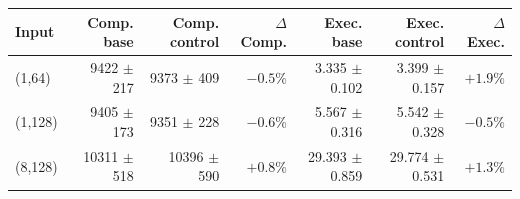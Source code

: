 \begin{tabular}{lrrrrrr}
\toprule
\textbf{Input} & \textbf{Comp. base} & \textbf{Comp. control} & \(\Delta\)\textbf{ Comp.} & \textbf{Exec. base} & \textbf{Exec. control} & \(\Delta\)\textbf{ Exec.} \\
\midrule
(1,64) & 9422 $\pm$ 217 & 9373 $\pm$ 409 & \(-0.5\%\) & 3.335 $\pm$ 0.102 & 3.399 $\pm$ 0.157 & \(+1.9\%\) \\
(1,128) & 9405 $\pm$ 173 & 9351 $\pm$ 228 & \(-0.6\%\) & 5.567 $\pm$ 0.316 & 5.542 $\pm$ 0.328 & \(-0.5\%\) \\
(8,128) & 10311 $\pm$ 518 & 10396 $\pm$ 590 & \(+0.8\%\) & 29.393 $\pm$ 0.859 & 29.774 $\pm$ 0.531 & \(+1.3\%\) \\
\bottomrule
\end{tabular}
